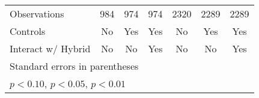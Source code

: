 {\begin{tabular}{l*{6}{c}}
\hline
Observations&      984         &      974         &      974         &     2320         &     2289         &     2289         \\
Controls  &       No         &      Yes         &      Yes         &       No         &      Yes         &      Yes         \\
Interact w/ Hybrid&       No         &       No         &      Yes         &       No         &       No         &      Yes         \\
\hline\hline
\multicolumn{7}{l}{\footnotesize Standard errors in parentheses}\\
\multicolumn{7}{l}{\footnotesize \sym{*} \(p<0.10\), \sym{**} \(p<0.05\), \sym{***} \(p<0.01\)}\\
\end{tabular}
}
